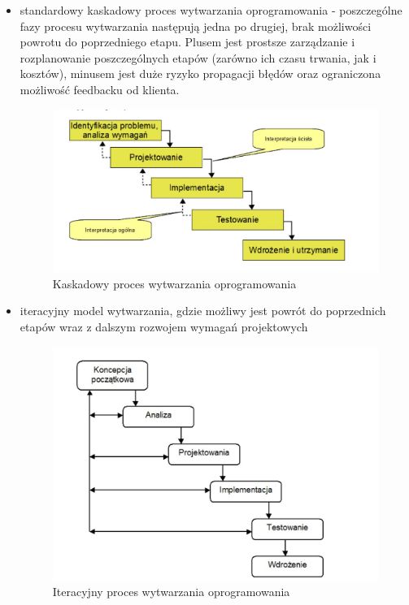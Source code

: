 \documentclass[a4paper,12pt,oneside]{book}
\begin{document}
                \begin{itemize}
                    \item standardowy kaskadowy proces wytwarzania oprogramowania - poszczególne fazy procesu wytwarzania następują jedna po drugiej, brak możliwości powrotu do poprzedniego etapu. Plusem jest prostsze zarządzanie i rozplanowanie poszczególnych etapów (zarówno ich czasu trwania, jak i kosztów), minusem jest duże ryzyko propagacji błędów oraz ograniczona możliwość feedbacku od klienta.
                    \begin{figure}[h]
                        \centering
                        \includegraphics[width=\textwidth/2]{images/kaskadowy.jpg}
                        \caption{Kaskadowy proces wytwarzania oprogramowania}
                        \label{fig:twojastara1}
                    \end{figure}
                    \item iteracyjny model wytwarzania, gdzie możliwy jest powrót do poprzednich etapów wraz z dalszym rozwojem wymagań projektowych
                    \begin{figure}
                        \centering
                        \includegraphics[width=\textwidth/2]{images/iteracyjmy.jpg}
                        \caption{Iteracyjny proces wytwarzania oprogramowania}
                        \label{fig:twojastara2}
                    \end{figure}
                \end{itemize}
\end{document}
